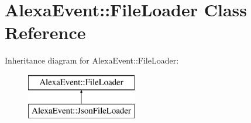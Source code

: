 \hypertarget{classAlexaEvent_1_1FileLoader}{}\section{Alexa\+Event\+:\+:File\+Loader Class Reference}
\label{classAlexaEvent_1_1FileLoader}
Inheritance diagram for Alexa\+Event\+:\+:File\+Loader\+:\begin{figure}[H]
\begin{center}
\leavevmode
\includegraphics[height=2.000000cm]{d2/d0f/classAlexaEvent_1_1FileLoader}
\end{center}
\end{figure}
